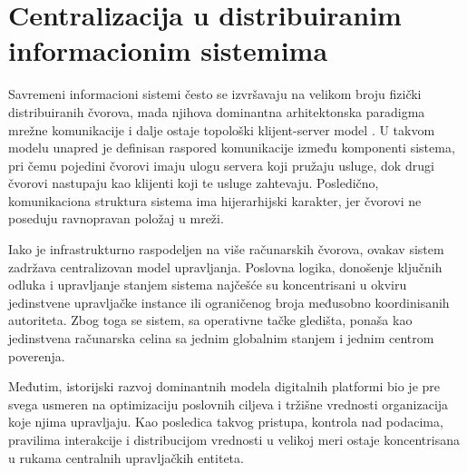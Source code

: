 \section{Centralizacija u distribuiranim informacionim sistemima}
Savremeni informacioni sistemi često se izvršavaju na velikom broju fizički distribuiranih čvorova, mada njihova dominantna arhitektonska paradigma mrežne komunikacije i dalje ostaje topološki klijent-server model \cite{berson1992client}. U takvom modelu unapred je definisan raspored komunikacije između komponenti sistema, pri čemu pojedini čvorovi imaju ulogu servera koji pružaju usluge, dok drugi čvorovi nastupaju kao klijenti koji te usluge zahtevaju. Posledično, komunikaciona struktura sistema ima hijerarhijski karakter, jer čvorovi ne poseduju ravnopravan položaj u mreži.

Iako je infrastrukturno raspodeljen na više računarskih čvorova, ovakav sistem zadržava centralizovan model upravljanja. Poslovna logika, donošenje ključnih odluka i upravljanje stanjem sistema najčešće su koncentrisani u okviru jedinstvene upravljačke instance ili ograničenog broja međusobno koordinisanih autoriteta. Zbog toga se sistem, sa operativne tačke gledišta, ponaša kao jedinstvena računarska celina sa jednim globalnim stanjem i jednim centrom poverenja.

Međutim, istorijski razvoj dominantnih modela digitalnih platformi bio je pre svega usmeren na optimizaciju poslovnih ciljeva i tržišne vrednosti organizacija koje njima upravljaju. Kao posledica takvog pristupa, kontrola nad podacima, pravilima interakcije i distribucijom vrednosti u velikoj meri ostaje koncentrisana u rukama centralnih upravljačkih entiteta.

